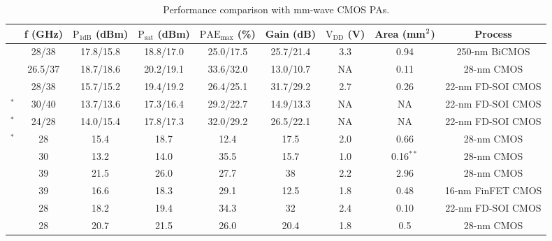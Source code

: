 \documentclass{IEEEtran}
\begin{document}
\begin{table}[!t]\footnotesize
	\renewcommand{\arraystretch}{1.5}
	\setlength{\tabcolsep}{5pt}
	\caption{Performance comparison with mm-wave CMOS PAs.}
	\label{comparison}
	\begin{minipage}{7in}
		\centering
		\begin{tabular}{c|c|c|c|c|c|c|c|c}
			\hline
			&f (GHz) &$\mathrm{P_{1dB}}$ (dBm)& $\mathrm{P_{sat}}$ (dBm)& $\mathrm{PAE_{max}}$ (\%) & Gain (dB)& $\mathrm{V_{DD}}$ (V) & Area (mm$\rm ^2$)& Process \\
			\hline\hline
    	\cite{ding202228} & 28/38  & 17.8/15.8 &  18.8/17.0 & 25.0/17.5 & 25.7/21.4 & 3.3 & 0.94 & 250-nm BiCMOS \\
			
         \cite{lee2021millimeter} & 26.5/37 & 18.7/18.6 & 20.2/19.1 & 33.6/32.0 & 13.0/10.7 & NA & 0.11 &28-nm CMOS \\

            \cite{xu202128} & 28/38 & 15.7/15.2 & 19.4/19.2& 26.4/25.1& 31.7/29.2 & 2.7 & 0.26 &22-nm FD-SOI CMOS \\

            \cite{mayeda2020highly}$^{\mathrm{*}}$ & 30/40 & 13.7/13.6  &  17.3/16.4 & 29.2/22.7 & 14.9/13.3 & NA &  NA & 22-nm FD-SOI CMOS \\
			
            \cite{mayeda2019effective}$^{\mathrm{*}}$ & 24/28 & 14.0/15.4  &  17.8/17.3 & 32.0/29.2 & 26.5/22.1 & NA & NA & 22-nm FD-SOI CMOS \\

            \cite{moret201728ghz}$^{\mathrm{*}}$ & 28 & 15.4   & 18.7 & 12.4 & 17.5 & 2.0 &   0.66 & 28-nm CMOS \\

             \cite{shakib2016highly} & 30 & 13.2 &  14.0 & 35.5 & 15.7 & 1.0 & 0.16$^{\mathrm{**}}$& 28-nm CMOS\\

             \cite{dasgupta201926} & 39 & 21.5 &  26.0 & 27.7 & 38 & 2.2 & 2.96 & 28-nm CMOS\\

             \cite{daneshgar2020high} & 39 & 16.6 &  18.3 & 29.1 & 12.5 & 1.8 & 0.48 & 16-nm FinFET CMOS\\

             \cite{tang2021design} & 28 & 18.2 &  19.4 &34.3 & 32 & 2.4 & 0.10 & 22-nm FD-SOI CMOS \\

     
            \cite{manente202028} & 28 & 20.7 &  21.5 & 26.0 & 20.4 & 1.8 & 0.5& 28-nm CMOS\\	
						

\end{tabular}
\end{minipage}
\end{table}
\end{document}
